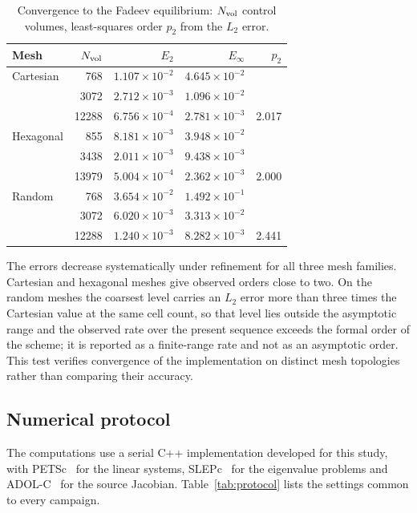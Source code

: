 \begin{table}[h]
\centering
\caption{Convergence to the Fadeev equilibrium: $N_{\rm vol}$ control volumes, least-squares order $p_2$ from the $L_2$ error.}
\label{tab:fadeev_convergence}
\begin{tabular}{lrrrr}
\toprule
Mesh & $N_{\rm vol}$ & $E_2$ & $E_\infty$ & $p_2$ \\
\midrule
Cartesian & 768   & $1.107\times10^{-2}$ & $4.645\times10^{-2}$ & \\
          & 3072  & $2.712\times10^{-3}$ & $1.096\times10^{-2}$ & \\
          & 12288 & $6.756\times10^{-4}$ & $2.781\times10^{-3}$ & 2.017 \\
\midrule
Hexagonal & 855   & $8.181\times10^{-3}$ & $3.948\times10^{-2}$ & \\
          & 3438  & $2.011\times10^{-3}$ & $9.438\times10^{-3}$ & \\
          & 13979 & $5.004\times10^{-4}$ & $2.362\times10^{-3}$ & 2.000 \\
\midrule
Random    & 768   & $3.654\times10^{-2}$ & $1.492\times10^{-1}$ & \\
          & 3072  & $6.020\times10^{-3}$ & $3.313\times10^{-2}$ & \\
          & 12288 & $1.240\times10^{-3}$ & $8.282\times10^{-3}$ & 2.441 \\
\bottomrule
\end{tabular}
\end{table}

The errors decrease systematically under refinement for all three mesh families. Cartesian and hexagonal meshes give observed orders close to two. On the random meshes the coarsest level carries an $L_2$ error more than three times the Cartesian value at the same cell count, so that level lies outside the asymptotic range and the observed rate over the present sequence exceeds the formal order of the scheme; it is reported as a finite-range rate and not as an asymptotic order. This test verifies convergence of the implementation on distinct mesh topologies rather than comparing their accuracy.



\subsection{Numerical protocol}
\label{subsec:numerical_protocol}

The computations use a serial C++ implementation developed for this study, with PETSc~\cite{petsc-efficient} for the linear systems, SLEPc~\cite{Hernandez2005SLEPc:Problems} for the eigenvalue problems and ADOL-C~\cite{Griewank1996AlgorithmADOL-C} for the source Jacobian. Table~\ref{tab:protocol} lists the settings common to every campaign.

